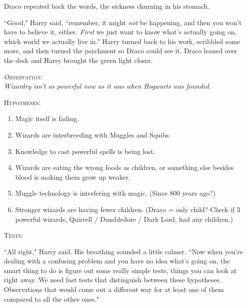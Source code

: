 Draco repeated back the words, the sickness churning in his stomach.

``Good," Harry said, ``remember, it might \emph{not} be happening, and then you won't have to believe it, either. \emph{First} we just want to know what's actually going on, which world we actually live in." Harry turned back to his work, scribbled some more, and then turned the parchment so Draco could see it. Draco leaned over the desk and Harry brought the green light closer.

\pagebreak[2]

\begin{center}
\itshape
{\scshape Observation:}\\
Wizardry isn't as powerful now as it was when Hogwarts was founded.

\vspace{.5\baselineskip plus 1\baselineskip minus .5\baselineskip}%

{\scshape Hypotheses:}
\begin{enumerate}[1.]
    \firmlist
    \item Magic itself is fading.
    \item Wizards are interbreeding with Muggles and Squibs.
    \item Knowledge to cast powerful spells is being lost.
    \item Wizards are eating the wrong foods as children, or something else besides blood is making them grow up weaker.
    \item Muggle technology is interfering with magic. (Since 800 years ago?)
    \item Stronger wizards are having fewer children. (Draco = only child? Check if 3 powerful wizards, Quirrell / Dumbledore / Dark Lord, had any children.)
\end{enumerate}

{\scshape Tests:}
\end{center}

\vspace{1\baselineskip}

``All right," Harry said. His breathing sounded a little calmer. ``Now when you're dealing with a confusing problem and you have no idea what's going on, the smart thing to do is figure out some really simple tests, things you can look at right away. We need fast tests that distinguish between these hypotheses. Observations that would come out a different way for at least one of them compared to all the other ones."

